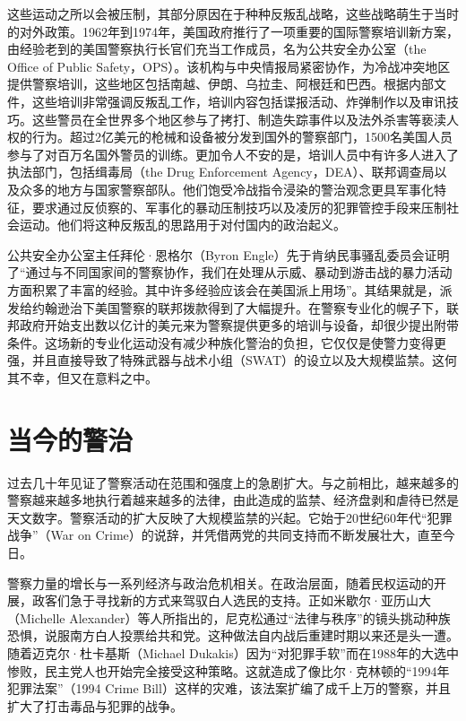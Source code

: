 \documentclass[fontset=fandol, a4paper, 12pt, openright]{ctexbook}
\begin{document}
这些运动之所以会被压制，其部分原因在于种种反叛乱战略，这些战略萌生于当时的对外政策。1962年到1974年，美国政府推行了一项重要的国际警察培训新方案，由经验老到的美国警察执行长官们充当工作成员，名为公共安全办公室（the Office of Public Safety，OPS）。该机构与中央情报局紧密协作，为冷战冲突地区提供警察培训，这些地区包括南越、伊朗、乌拉圭、阿根廷和巴西。根据内部文件，这些培训非常强调反叛乱工作，培训内容包括谍报活动、炸弹制作以及审讯技巧。这些警员在全世界多个地区参与了拷打、制造失踪事件以及法外杀害等亵渎人权的行为。超过2亿美元的枪械和设备被分发到国外的警察部门，1500名美国人员参与了对百万名国外警员的训练。更加令人不安的是，培训人员中有许多人进入了执法部门，包括缉毒局（the Drug Enforcement Agency，DEA）、联邦调查局以及众多的地方与国家警察部队。他们饱受冷战指令浸染的警治观念更具军事化特征，要求通过反侦察的、军事化的暴动压制技巧以及凌厉的犯罪管控手段来压制社会运动。他们将这种反叛乱的思路用于对付国内的政治起义。

公共安全办公室主任拜伦·恩格尔（Byron Engle）先于肯纳民事骚乱委员会证明了“通过与不同国家间的警察协作，我们在处理从示威、暴动到游击战的暴力活动方面积累了丰富的经验。其中许多经验应该会在美国派上用场”。其结果就是，派发给约翰逊治下美国警察的联邦拨款得到了大幅提升。在警察专业化的幌子下，联邦政府开始支出数以亿计的美元来为警察提供更多的培训与设备，却很少提出附带条件。这场新的专业化运动没有减少种族化警治的负担，它仅仅是使警力变得更强，并且直接导致了特殊武器与战术小组（SWAT）的设立以及大规模监禁。这何其不幸，但又在意料之中。

\section{当今的警治}

过去几十年见证了警察活动在范围和强度上的急剧扩大。与之前相比，越来越多的警察越来越多地执行着越来越多的法律，由此造成的监禁、经济盘剥和虐待已然是天文数字。警察活动的扩大反映了大规模监禁的兴起。它始于20世纪60年代“犯罪战争”（War on Crime）的说辞，并凭借两党的共同支持而不断发展壮大，直至今日。

警察力量的增长与一系列经济与政治危机相关。在政治层面，随着民权运动的开展，政客们急于寻找新的方式来驾驭白人选民的支持。正如米歇尔·亚历山大（Michelle Alexander）等人所指出的，尼克松通过“法律与秩序”的镜头挑动种族恐惧，说服南方白人投票给共和党。这种做法自内战后重建时期以来还是头一遭。随着迈克尔·杜卡基斯（Michael Dukakis）因为“对犯罪手软”而在1988年的大选中惨败，民主党人也开始完全接受这种策略。这就造成了像比尔·克林顿的“1994年犯罪法案”（1994 Crime Bill）这样的灾难，该法案扩编了成千上万的警察，并且扩大了打击毒品与犯罪的战争。
\end{document}
